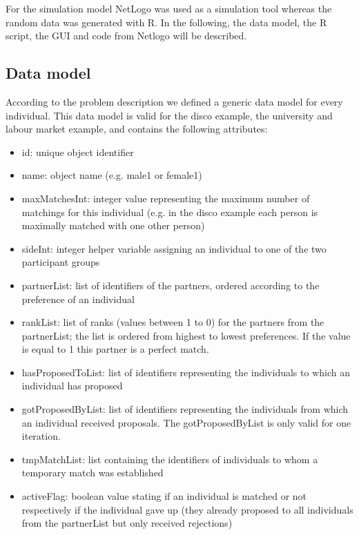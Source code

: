 \label{prototype}
For the simulation model NetLogo was used as a simulation tool whereas the random data was generated with R.
In the following, the data model, the R script, the GUI and code from Netlogo will be described.
\subsection{Data model}
According to the problem description we defined a generic data model for every individual.
This data model is valid for the disco example, the university and labour market example, and contains the following attributes:
\begin{itemize}
	\item id: unique object identifier
	\item name: object name (e.g. male1 or female1)
	\item maxMatchesInt: integer value representing the maximum number of matchings for this individual (e.g. in the disco example each person is maximally matched with one other person)
	\item sideInt: integer helper variable assigning an individual to one of the two participant groups
	\item partnerList: list of identifiers of the partners, ordered according to the preference of an individual
	\item rankList: list of ranks (values between 1 to 0) for the partners from the partnerList; the list is ordered from highest to lowest preferences.
	If the value is equal to 1 this partner is a perfect match.
	\item hasProposedToList: list of identifiers representing the individuals to which an individual has proposed
	\item gotProposedByList: list of identifiers representing the individuals from which an individual received proposals.
	The gotProposedByList is only valid for one iteration.
	\item tmpMatchList: list containing the identifiers of individuals to whom a temporary match was established
	\item activeFlag: boolean value stating if an individual is matched or not respectively if the individual gave up (they already proposed to all individuals from the partnerList but only received rejections)
\end{itemize}

